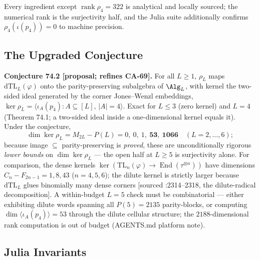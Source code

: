 Every ingredient except \(\operatorname{rank}\rho_4=322\) is analytical and
locally sourced; the numerical rank is the surjectivity half, and the Julia
suite additionally confirms \(\rho_4(\iota(p_4))=0\) to machine precision.

\subsection{The Upgraded Conjecture}

\textbf{Conjecture 74.2 [proposal; refines CA-69].}  For all \(L\ge1\),
\(\rho_L\) maps \(\mathrm{dTL}_L(\varphi)\) onto the parity-preserving
subalgebra of \(\Alg_L\), with kernel the two-sided ideal generated by the
corner Jones--Wenzl embeddings,
\(\ker\rho_L=\langle\iota_A(p_4):A\subseteq[L],\,|A|=4\rangle\).  Exact for
\(L\le3\) (zero kernel) and \(L=4\) (Theorem 74.1; a two-sided ideal inside
a one-dimensional kernel equals it).  Under the conjecture,
\[
  \dim\ker\rho_L=M_{2L}-P(L)=0,\ 0,\ 1,\ \mathbf{53},\ \mathbf{1066}
  \quad(L=2,\dots,6);
\]
because image \(\subseteq\) parity-preserving is \emph{proved}, these are
unconditionally rigorous \emph{lower bounds} on \(\dim\ker\rho_L\) — the
open half at \(L\ge5\) is surjectivity alone.  For comparison, the dense
kernels \(\ker(\mathrm{TL}_n(\varphi)\to
\operatorname{End}(\tau^{\otimes n}))\) have dimensions
\(C_n-F_{2n-1}=1,8,43\) (\(n=4,5,6\)); the dilute kernel is strictly larger
because \(\mathrm{dTL}_L\) glues binomially many dense corners [sourced
:2314--2318, the dilute-radical decomposition].  A within-budget \(L=5\)
check must be combinatorial — either exhibiting dilute words spanning all
\(P(5)=2135\) parity-blocks, or computing
\(\dim\langle\iota_A(p_4)\rangle=53\) through the dilute cellular
structure; the \(2188\)-dimensional rank computation is out of budget
(AGENTS.md platform note).

\subsection{Julia Invariants}

